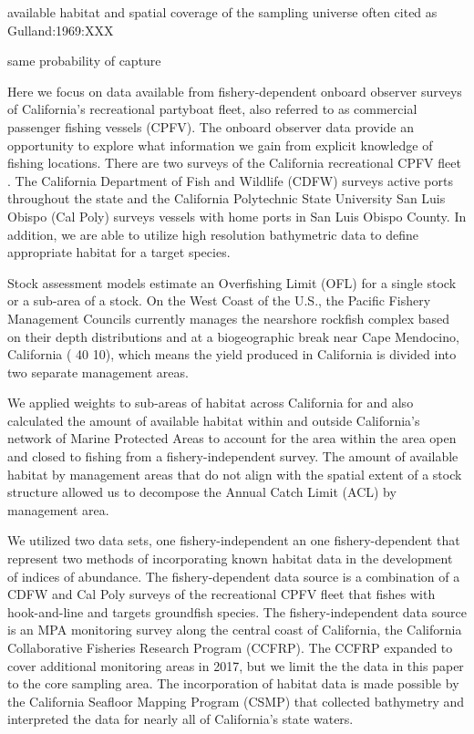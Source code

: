 \documentclass[
  12pt,
  authoryear,
  preprint,
  3p]{elsarticle}
\begin{document}
available habitat and spatial coverage of the sampling universe often
cited as Gulland:1969:XXX

same probability of capture \citep{Seber:1982:xxx}

Here we focus on data available from fishery-dependent onboard observer
surveys of California's recreational partyboat fleet, also referred to
as commercial passenger fishing vessels (CPFV). The onboard observer
data provide an opportunity to explore what information we gain from
explicit knowledge of fishing locations. There are two surveys of the
California recreational CPFV fleet \citep{Monk:2014:DRD}. The California
Department of Fish and Wildlife (CDFW) surveys active ports throughout
the state and the California Polytechnic State University San Luis
Obispo (Cal Poly) surveys vessels with home ports in San Luis Obispo
County. In addition, we are able to utilize high resolution bathymetric
data to define appropriate habitat for a target species.

Stock assessment models estimate an Overfishing Limit (OFL) for a single
stock or a sub-area of a stock. On the West Coast of the U.S., the
Pacific Fishery Management Councils currently manages the nearshore
rockfish complex based on their depth distributions and at a
biogeographic break near Cape Mendocino, California ( 40 10), which
means the yield produced in California is divided into two separate
management areas.

We applied weights to sub-areas of habitat across California for and
also calculated the amount of available habitat within and outside
California's network of Marine Protected Areas to account for the area
within the area open and closed to fishing from a fishery-independent
survey. The amount of available habitat by management areas that do not
align with the spatial extent of a stock structure allowed us to
decompose the Annual Catch Limit (ACL) by management area.

We utilized two data sets, one fishery-independent an one
fishery-dependent that represent two methods of incorporating known
habitat data in the development of indices of abundance. The
fishery-dependent data source is a combination of a CDFW and Cal Poly
surveys of the recreational CPFV fleet that fishes with hook-and-line
and targets groundfish species. The fishery-independent data source is
an MPA monitoring survey along the central coast of California, the
California Collaborative Fisheries Research Program (CCFRP). The CCFRP
expanded to cover additional monitoring areas in 2017, but we limit the
the data in this paper to the core sampling area. The incorporation of
habitat data is made possible by the California Seafloor Mapping Program
(CSMP) that collected bathymetry and interpreted the data for nearly all
of California's state waters.
\end{document}
